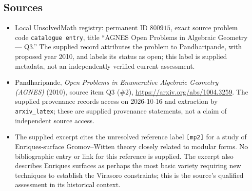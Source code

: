 \documentclass[11pt]{article}
\begin{document}
\subsection{Sources}
\begin{itemize}
\item Local UnsolvedMath registry: permanent ID \(800915\), exact source problem code \texttt{catalogue entry}, title ``AGNES Open Problems in Algebraic Geometry --- Q3.'' The supplied record attributes the problem to Pandharipande, with proposed year 2010, and labels its status as open; this label is supplied metadata, not an independently verified current assessment.
\item Pandharipande, \emph{Open Problems in Enumerative Algebraic Geometry (AGNES)} (2010), source item Q3 (\#2), \url{https://arxiv.org/abs/1004.3259}. The supplied provenance records access on 2026-10-16 and extraction by \texttt{arxiv\_latex}; these are supplied provenance statements, not a claim of independent source access.
\item The supplied excerpt cites the unresolved reference label \texttt{[mp2]} for a study of Enriques-surface Gromov--Witten theory closely related to modular forms. No bibliographic entry or link for this reference is supplied. The excerpt also describes Enriques surfaces as perhaps the most basic variety requiring new techniques to establish the Virasoro constraints; this is the source's qualified assessment in its historical context.
\end{itemize}
\end{document}
